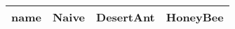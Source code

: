 \begin{tabular} {|l|l|l|l|}
\hline
name & Naive & DesertAnt & HoneyBee \\
\hline
\hline
\end{tabular}
